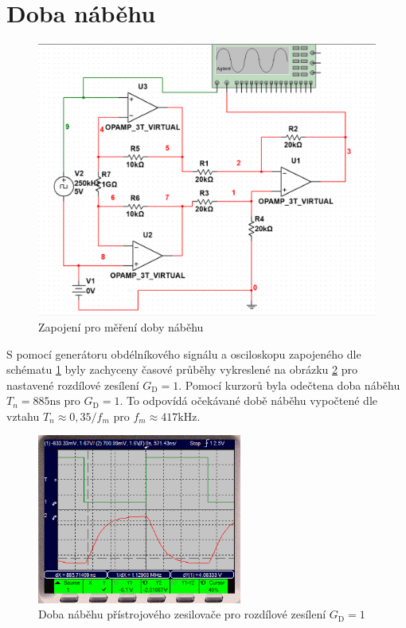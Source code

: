 \documentclass[twoside]{article}
\begin{document}
\section{Doba náběhu}

\begin{figure}[h!]
    \centering
    \includegraphics[width=0.7\linewidth]{rise_time_schema.png}
    \caption{Zapojení pro měření doby náběhu}
    \label{fig:rise_time_schema}
\end{figure}

S pomocí generátoru obdélníkového signálu a osciloskopu zapojeného dle schématu \ref{fig:rise_time_schema}
byly zachyceny časové průběhy vykreslené na obrázku \ref{fig:rise_time_1} pro nastavené rozdílové zesílení $G_\text{D} = 1$.
Pomocí kurzorů byla odečtena doba náběhu $T_n = 885 \si{\nano\second}$ pro $G_\text{D} = 1$. To odpovídá očekávané
době náběhu vypočtené dle vztahu $T_n \approx 0,35 / f_m$ pro $f_m \approx 417 \si{\kilo\hertz}$.

\begin{figure}[h!]
    \centering
    \includegraphics[width=0.6\textwidth]{rise_time_1.png}
    \caption{Doba náběhu přístrojového zesilovače pro rozdílové zesílení $G_\text{D}=1$}
    \label{fig:rise_time_1}
\end{figure}
\end{document}
